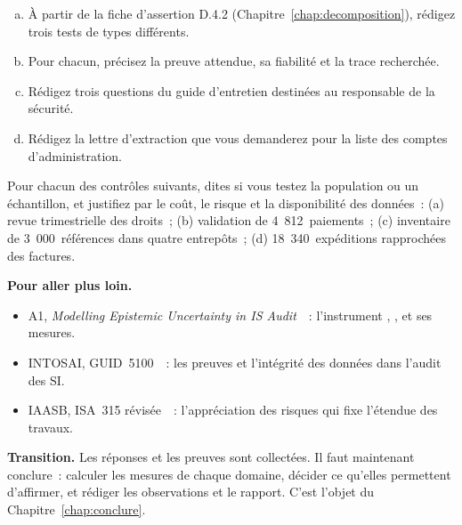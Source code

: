 \begin{boxexo}[title={\ding{45}\quad Exercice~10.9. Le plan de tests du sous-domaine D.4 \niveauexpert}]
\begin{enumerate}[(a)]
    \item À partir de la fiche d'assertion D.4.2 (Chapitre~\ref{chap:decomposition}),
          rédigez trois tests de types différents.
    \item Pour chacun, précisez la preuve attendue, sa fiabilité et la trace
          recherchée.
    \item Rédigez trois questions du guide d'entretien destinées au
          responsable de la sécurité.
    \item Rédigez la lettre d'extraction que vous demanderez pour la liste
          des comptes d'administration.
\end{enumerate}
\end{boxexo}

\begin{boxexo}[title={\ding{45}\quad Exercice~10.10. Population ou échantillon~? \niveauexpert}]
Pour chacun des contrôles suivants, dites si vous testez la population ou
un échantillon, et justifiez par le coût, le risque et la disponibilité des
données~: (a) revue trimestrielle des droits~; (b) validation de
4~812~paiements~; (c) inventaire de 3~000~références dans quatre
entrepôts~; (d) 18~340~expéditions rapprochées des factures.
\end{boxexo}

\bigskip

\begin{boxinfo}
\textbf{Pour aller plus loin.}
\begin{itemize}
    \item A1, \textit{Modelling Epistemic Uncertainty in IS
          Audit}~\cite{minka2026nek}~: l'instrument \OUI{}, \NON{}, \NEK{}
          et ses mesures.
    \item INTOSAI, GUID~5100~\cite{intosai2019guid5100}~: les preuves et
          l'intégrité des données dans l'audit des SI.
    \item IAASB, ISA~315 révisée~\cite{iaasb2019isa315}~: l'appréciation des
          risques qui fixe l'étendue des travaux.
\end{itemize}
\end{boxinfo}

\begin{boxinfo}
\textbf{Transition.} Les réponses et les preuves sont collectées. Il faut
maintenant conclure~: calculer les mesures de chaque domaine, décider ce
qu'elles permettent d'affirmer, et rédiger les observations et le rapport.
C'est l'objet du Chapitre~\ref{chap:conclure}.
\end{boxinfo}
